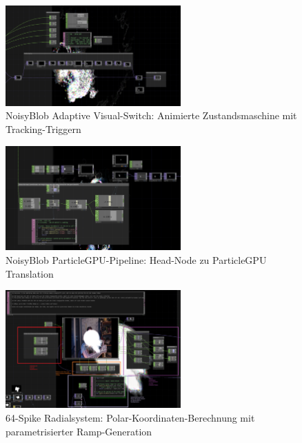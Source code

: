 \begin{figure}[!htbp]
    \centering
    \includegraphics[width=0.6\textwidth,height=0.25\textheight,keepaspectratio]{images/docupictures/NoisyBlob_animatedSwitchzwischenBlitzUndNichtBlitzBeiTrackingTrigger.png}
    \caption{NoisyBlob Adaptive Visual-Switch: Animierte Zustandsmaschine mit Tracking-Triggern}
    \label{fig:animated_switch}
\end{figure}

\begin{figure}[!htbp]
    \centering
    \includegraphics[width=0.6\textwidth,height=0.25\textheight,keepaspectratio]{images/docupictures/NoisyBlob_HEAD_to_ParticleGPU_Translate.png}
    \caption{NoisyBlob ParticleGPU-Pipeline: Head-Node zu ParticleGPU Translation}
    \label{fig:particle_translation}
\end{figure}

\begin{figure}[!htbp]
    \centering
    \includegraphics[width=0.6\textwidth,height=0.25\textheight,keepaspectratio]{images/docupictures/TopDown_KreisZuRampsParametisierteBerechnungen.png}
    \caption{64-Spike Radialsystem: Polar-Koordinaten-Berechnung mit parametrisierter Ramp-Generation}
    \label{fig:radial_spike_system}
\end{figure}

